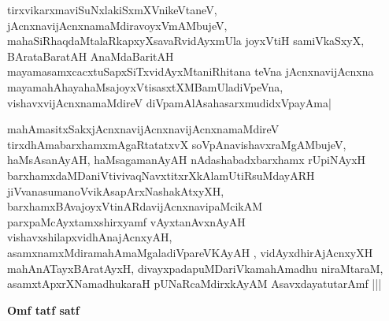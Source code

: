 tirxvikarxmaviSuNxlakiSxmXVnikeVtaneV, jAcnxnavijAcnxnamaMdiravoyxVmAMbujeV, mahaSiRhaqdaMtalaRkapxyXsavaRvidAyxmUla joyxVtiH  samiVkaSxyX, BArataBaratAH AnaMdaBaritAH mayamasamxcacxtuSapxSiTxvidAyxMtaniRhitana teVna jAcnxnavijAcnxna mayamahAhayahaMsajoyxVtisasxtXMBamUladiVpeVna, vishavxvijAcnxnamaMdireV diVpamAlAsahasarxmudidxVpayAma|

mahAmasitxSakxjAcnxnavijAcnxnavijAcnxnamaMdireV tirxdhAmabarxhamxmAgaRtatatxvX  soVpAnavishavxraMgAMbujeV, haMsAsanAyAH, haMsagamanAyAH nAdashabadxbarxhamx rUpiNAyxH barxhamxdaMDaniVtivivaqNavxtitxrXkAlamUtiRsuMdayARH jiVvanasumanoVvikAsapArxNashakAtxyXH, barxhamxBAvajoyxVtinARdavijAcnxnavipaMcikAM parxpaMcAyxtamxshirxyamf vAyxtanAvxnAyAH vishavxshilapxvidhAnajAcnxyAH, asamxnamxMdiramahAmaMgaladiVpareVKAyAH , vidAyxdhirAjAcnxyXH mahAnATayxBAratAyxH, divayxpadapuMDariVkamahAmadhu niraMtaraM, asamxtApxrXNamadhukaraH pUNaRcaMdirxkAyAM AsavxdayatutarAmf |||

\vskip 30pt

\centerline{\bf Omf tatf satf}


